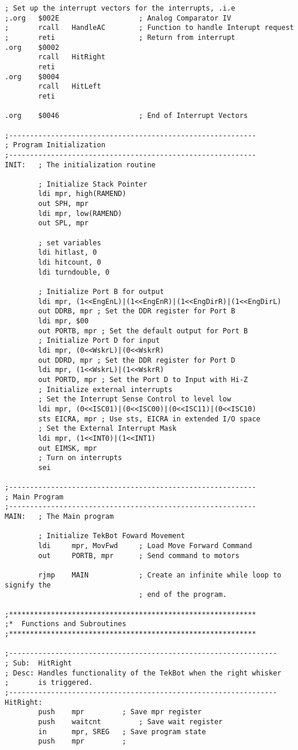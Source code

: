 \documentclass[12pt,letterpaper]{article}
\begin{document}
\begin{verbatim}
; Set up the interrupt vectors for the interrupts, .i.e
;.org	$002E					; Analog Comparator IV
;		rcall	HandleAC		; Function to handle Interupt request
;		reti					; Return from interrupt
.org	$0002
		rcall	HitRight
		reti
.org	$0004
		rcall	HitLeft
		reti

.org	$0046					; End of Interrupt Vectors

;-----------------------------------------------------------
; Program Initialization
;-----------------------------------------------------------
INIT:	; The initialization routine

		; Initialize Stack Pointer
		ldi mpr, high(RAMEND)
		out SPH, mpr
		ldi mpr, low(RAMEND)
		out SPL, mpr

        ; set variables
        ldi hitlast, 0
        ldi hitcount, 0
		ldi turndouble, 0

		; Initialize Port B for output
		ldi mpr, (1<<EngEnL)|(1<<EngEnR)|(1<<EngDirR)|(1<<EngDirL)
		out DDRB, mpr ; Set the DDR register for Port B
		ldi mpr, $00
		out PORTB, mpr ; Set the default output for Port B
		; Initialize Port D for input
		ldi mpr, (0<<WskrL)|(0<<WskrR)
		out DDRD, mpr ; Set the DDR register for Port D
		ldi mpr, (1<<WskrL)|(1<<WskrR)
		out PORTD, mpr ; Set the Port D to Input with Hi-Z
		; Initialize external interrupts
		; Set the Interrupt Sense Control to level low
		ldi mpr, (0<<ISC01)|(0<<ISC00)|(0<<ISC11)|(0<<ISC10)
		sts EICRA, mpr ; Use sts, EICRA in extended I/O space
		; Set the External Interrupt Mask
		ldi mpr, (1<<INT0)|(1<<INT1)
		out EIMSK, mpr
		; Turn on interrupts
		sei

;-----------------------------------------------------------
; Main Program
;-----------------------------------------------------------
MAIN:	; The Main program

		; Initialize TekBot Foward Movement
		ldi		mpr, MovFwd		; Load Move Forward Command
		out		PORTB, mpr		; Send command to motors

		rjmp	MAIN			; Create an infinite while loop to signify the 
								; end of the program.

;***********************************************************
;*	Functions and Subroutines
;***********************************************************

;----------------------------------------------------------------
; Sub:	HitRight
; Desc:	Handles functionality of the TekBot when the right whisker
;		is triggered.
;----------------------------------------------------------------
HitRight:
		push	mpr			; Save mpr register
		push	waitcnt			; Save wait register
		in		mpr, SREG	; Save program state
		push	mpr			;


\end{verbatim}
\end{document}
